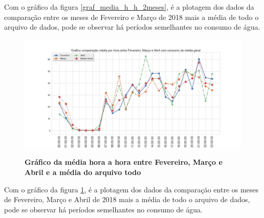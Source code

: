 \par Com o gráfico da figura \ref{graf_media_h_h_2meses}, é a plotagem dos dados da comparação entre os meses de Fevereiro e Março de 2018 mais a média de todo o arquivo de dados, pode se observar há períodos semelhantes no consumo de água.

\begin{figure}[h]
	\caption{\textbf{Gráfico da média hora a hora entre Fevereiro, Março e Abril e a média do arquivo todo}}
	\centering
		\includegraphics[width=\textwidth,height=\textheight , keepaspectratio]{figuras/comparacaomediahorarientretresmesesconsumo}
		\label{graf_media_h_h_3meses}
\end{figure}

\par Com o gráfico da figura \ref{graf_media_h_h_3meses}, é a plotagem dos dados da comparação entre os meses de Fevereiro, Março e Abril de 2018 mais a média de todo o arquivo de dados, pode se observar há períodos semelhantes no consumo de água. 
